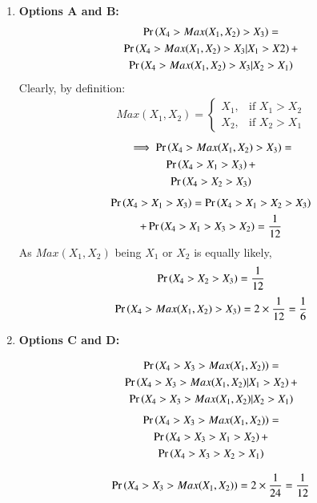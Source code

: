 \documentclass[journal,12pt,twocolumn]{IEEEtran}
\begin{document}
\begin{enumerate}
    \item \textbf{Options A and B:}
\begin{multline}
    \Pr\left(X_4 > Max(X_1,X_2) > X_3\right) = \\\Pr\left(X_4 > Max(X_1,X_2) > X_3 | X_1>X2 \right) + \\ \Pr\left(X_4 > Max(X_1,X_2) > X_3 | X_2>X_1 \right)
\end{multline}
Clearly, by definition:
\begin{align}
  Max(X_1,X_2) = 
  \begin{cases}
      X_1, & \text{if } X_1>X_2\\
    X_2, & \text{if } X_2>X_1
  \end{cases}
\end{align}
\begin{multline}
    \implies \Pr\left(X_4 > Max(X_1,X_2) > X_3\right) = \\\Pr\left(X_4 > X_1 > X_3 \right) + \\ \Pr\left(X_4 > X_2 > X_3\right)
\end{multline}
\begin{multline}
    \Pr\left(X_4 > X_1 > X_3\right) = \Pr\left(X_4 > X_1 > X_2> X_3\right) \\+\Pr\left(X_4 > X_1 > X_3 > X_2\right)
= \frac{1}{12}
\end{multline}
As $Max(X_1,X_2)$ being $X_1$ or $X_2$ is equally likely,
\begin{align}
\Pr\left(X_4 > X_2 > X_3\right) = \frac{1}{12}
\end{align}
\begin{align}
\Pr\left(X_4 > Max(X_1,X_2) > X_3\right) = 2 \times \frac{1}{12} = \frac{1}{6}
\end{align}

\item \textbf{Options C and D:} 

\begin{multline}
    \Pr\left(X_4 > X_3 > Max(X_1,X_2)\right) = \\\Pr\left(X_4 > X_3 > Max(X_1,X_2)| X_1>X_2\right) + \\\Pr\left(X_4 > X_3 > Max(X_1,X_2)| X_2>X_1\right)
\end{multline}
\begin{multline}
    \Pr\left(X_4 > X_3 > Max(X_1,X_2)\right) = \\\Pr\left(X_4 > X_3 > X_1 > X_2\right) + \\\Pr\left(X_4 > X_3 > X_2 > X_1\right)
\end{multline}  

\begin{align}
    \Pr\left(X_4 > X_3 > Max(X_1,X_2)\right) = 2 \times \frac{1}{24} = \frac{1}{12}
\end{align}
\end{enumerate}

\bigskip
{}
\end{document}
